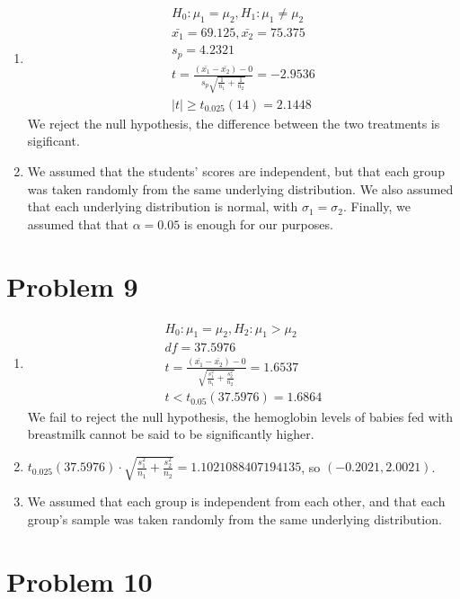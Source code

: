 \documentclass{article}
\begin{document}
\begin{enumerate}
	\item
		\begin{gather*}
			H_0: \mu_1 = \mu_2, H_1: \mu_1 \ne \mu_2 \\
			\bar{x_1} = 69.125, \bar{x_2} = 75.375 \\
			s_p = 4.2321 \\
			t = \frac{(\bar{x_1} - \bar{x_2}) - 0}{s_p \sqrt{\frac{1}{n_1} + \frac{1}{n_2}}}
			= -2.9536 \\
			|t| \ge t_{0.025}(14) = 2.1448
		\end{gather*}
		We reject the null hypothesis, the difference between the two
		treatments is sigificant.
	\item We assumed that the students' scores are independent, but that
		each group was taken randomly from the same underlying
		distribution. We also assumed that each underlying distribution
		is normal, with $\sigma_1 = \sigma_2$. Finally, we assumed that
		that $\alpha = 0.05$ is enough for our purposes.
\end{enumerate}

\section*{Problem 9}

\begin{enumerate}
	\item
		\begin{gather*}
			H_0: \mu_1 = \mu_2, H_2: \mu_1 > \mu_2 \\
			df = 37.5976 \\
			t = \frac{(\bar{x_1}-\bar{x_2}) - 0}{\sqrt{\frac{s_1^2}{n_1} + \frac{s_2^2}{n_2}}}
			= 1.6537 \\
			t < t_{0.05}(37.5976) = 1.6864
		\end{gather*}
		We fail to reject the null hypothesis, the hemoglobin levels of
		babies fed with breastmilk cannot be said to be significantly
		higher.
	\item $t_{0.025}(37.5976) \cdot \sqrt{\frac{s_1^2}{n_1} + \frac{s_2^2}{n_2}} = 1.1021088407194135$, so $(-0.2021, 2.0021)$.
	\item We assumed that each group is independent from each other, and
		that each group's sample was taken randomly from the same
		underlying distribution.
\end{enumerate}

\section*{Problem 10}
\end{document}
